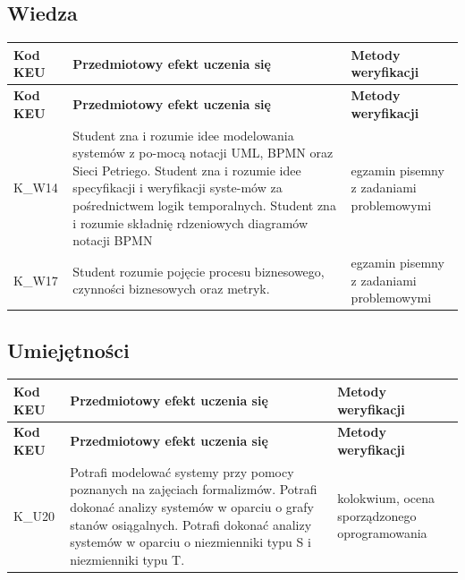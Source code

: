 \documentclass[12pt, a4paper]{article}
\newcommand{\thdrule}{\noalign{\global\setlength{\extrarowheight}{0pt}}}
\newcommand{\thdend}{\noalign{\global\setlength{\extrarowheight}{3pt}}}
\begin{document}
\subsection*{Wiedza}
{\scriptsize
\begin{longtable}{m{1.6cm}m{9.0cm}m{4.2cm}}
\thdrule\toprule
\rowcolor{pjatkRed} {\color{white}\footnotesize\textbf{\vphantom{Ag}Kod KEU}} & {\color{white}\footnotesize\textbf{\vphantom{Ag}Przedmiotowy efekt uczenia się}} & {\color{white}\footnotesize\textbf{\vphantom{Ag}Metody weryfikacji}} \\
\midrule\thdend
\endfirsthead
\thdrule\toprule
\rowcolor{pjatkRed} {\color{white}\footnotesize\textbf{\vphantom{Ag}Kod KEU}} & {\color{white}\footnotesize\textbf{\vphantom{Ag}Przedmiotowy efekt uczenia się}} & {\color{white}\footnotesize\textbf{\vphantom{Ag}Metody weryfikacji}} \\
\midrule\thdend
\endhead
  \rowcolor{tableRowLight} K\_W14 & Student zna i rozumie idee modelowania systemów z po-mocą notacji UML, BPMN oraz Sieci Petriego. Student zna i rozumie idee specyfikacji i weryfikacji syste-mów za pośrednictwem logik temporalnych. Student zna i rozumie składnię rdzeniowych diagramów notacji BPMN & egzamin pisemny z zadaniami problemowymi \\
  \rowcolor{tableRowAlt} K\_W17 & Student rozumie pojęcie procesu biznesowego, czynności biznesowych oraz metryk. & egzamin pisemny z zadaniami problemowymi \\
\bottomrule
\end{longtable}}

\subsection*{Umiejętności}
{\scriptsize
\begin{longtable}{m{1.6cm}m{9.0cm}m{4.2cm}}
\thdrule\toprule
\rowcolor{pjatkRed} {\color{white}\footnotesize\textbf{\vphantom{Ag}Kod KEU}} & {\color{white}\footnotesize\textbf{\vphantom{Ag}Przedmiotowy efekt uczenia się}} & {\color{white}\footnotesize\textbf{\vphantom{Ag}Metody weryfikacji}} \\
\midrule\thdend
\endfirsthead
\thdrule\toprule
\rowcolor{pjatkRed} {\color{white}\footnotesize\textbf{\vphantom{Ag}Kod KEU}} & {\color{white}\footnotesize\textbf{\vphantom{Ag}Przedmiotowy efekt uczenia się}} & {\color{white}\footnotesize\textbf{\vphantom{Ag}Metody weryfikacji}} \\
\midrule\thdend
\endhead
  \rowcolor{tableRowLight} K\_U20 & Potrafi modelować systemy przy pomocy poznanych na zajęciach formalizmów. Potrafi dokonać analizy systemów w oparciu o grafy stanów osiągalnych. Potrafi dokonać analizy systemów w oparciu o niezmienniki typu S i niezmienniki typu T. & kolokwium, ocena sporządzonego oprogramowania \\
\bottomrule
\end{longtable}}
\end{document}
